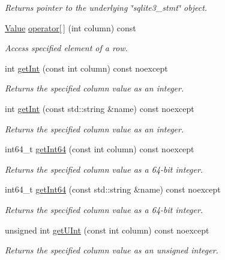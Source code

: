 \begin{DoxyCompactItemize}
\begin{DoxyCompactList}\small\item\em Returns pointer to the underlying \char`\"{}sqlite3\-\_\-stmt\char`\"{} object. \end{DoxyCompactList}\item 
\hyperlink{a00015}{Value} \hyperlink{a00011_a82ca0ee6352667cc9f6d41972dedd5a6}{operator\mbox{[}$\,$\mbox{]}} (int column) const 
\begin{DoxyCompactList}\small\item\em Access specified element of a row. \end{DoxyCompactList}\item 
int \hyperlink{a00010_a82c5bc45048b8328a2fcc9bb4ff975f2}{get\-Int} (const int column) const noexcept
\begin{DoxyCompactList}\small\item\em Returns the specified column value as an integer. \end{DoxyCompactList}\item 
int \hyperlink{a00010_a87dd8234c2bd5f19466813f8a68ab80a}{get\-Int} (const std\-::string \&name) const noexcept
\begin{DoxyCompactList}\small\item\em Returns the specified column value as an integer. \end{DoxyCompactList}\item 
int64\-\_\-t \hyperlink{a00010_adb7b9705a4638d6d5af5ca26dfa474ff}{get\-Int64} (const int column) const noexcept
\begin{DoxyCompactList}\small\item\em Returns the specified column value as a 64-\/bit integer. \end{DoxyCompactList}\item 
int64\-\_\-t \hyperlink{a00010_aea6d24bb9247bfc52fe77d62be961dd2}{get\-Int64} (const std\-::string \&name) const noexcept
\begin{DoxyCompactList}\small\item\em Returns the specified column value as a 64-\/bit integer. \end{DoxyCompactList}\item 
unsigned int \hyperlink{a00010_a971fb706b9215a89532ac48640f94832}{get\-U\-Int} (const int column) const noexcept
\begin{DoxyCompactList}\small\item\em Returns the specified column value as an unsigned integer. \end{DoxyCompactList}\item 

\end{DoxyCompactItemize}
